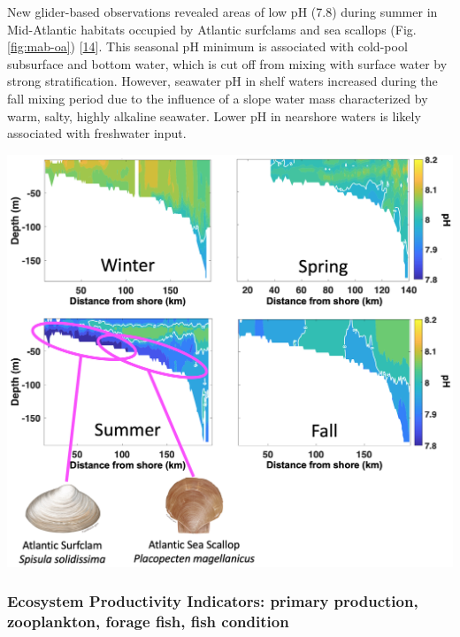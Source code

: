 \documentclass[
  10pt,
]{article}
\let\origfigure\figure
\let\endorigfigure\endfigure
\renewenvironment{figure}[1][2] {
    \expandafter\origfigure\expandafter[H]
} {
    \endorigfigure
}
\begin{document}
New glider-based observations revealed areas of low pH (7.8) during
summer in Mid-Atlantic habitats occupied by Atlantic surfclams and sea
scallops (Fig. \ref{fig:mab-oa})
{[}\protect\hyperlink{ref-wrightfairbanks_autonomous_2020}{14}{]}. This
seasonal pH minimum is associated with cold-pool subsurface and bottom
water, which is cut off from mixing with surface water by strong
stratification. However, seawater pH in shelf waters increased during
the fall mixing period due to the influence of a slope water mass
characterized by warm, salty, highly alkaline seawater. Lower pH in
nearshore waters is likely associated with freshwater input.

\begin{figure}

{\centering \includegraphics[width=0.7\linewidth]{images/Seasonal pH on MAB shelf - Grace Saba} 

}

\caption{ Seasonal glider-based pH observations on the Mid-Atlantic Bight shelf (New Jersey cross-shelf transect) in relation to Atlantic surfclam and Atlantic sea scallop habitats (modified from Wright-Fairbanks et al. 2020).}\label{fig:mab-oa}
\end{figure}

\hypertarget{ecosystem-productivity-indicators-primary-production-zooplankton-forage-fish-fish-condition}{%
\subsubsection{Ecosystem Productivity Indicators: primary production,
zooplankton, forage fish, fish
condition}\label{ecosystem-productivity-indicators-primary-production-zooplankton-forage-fish-fish-condition}}
\end{document}

